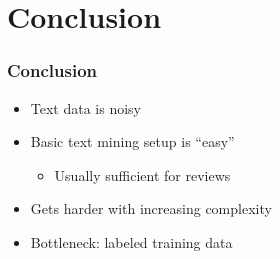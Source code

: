 \section{Conclusion}

\begin{frame}
\frametitle{Conclusion}
\begin{itemize}
\item Text data is noisy
\item Basic text mining setup is ``easy''
\begin{itemize}
\item Usually sufficient for reviews
\end{itemize}
\item Gets harder with increasing complexity
\item Bottleneck: labeled training data
\end{itemize}
\end{frame}
